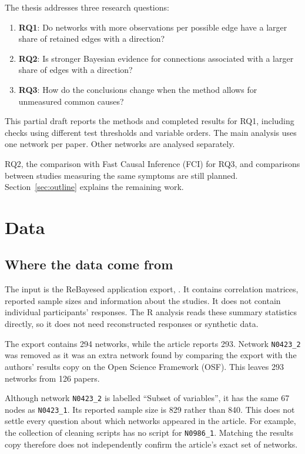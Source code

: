\documentclass[11pt,a4paper]{article}
\begin{document}
The thesis addresses three research questions:
\begin{enumerate}
\item \textbf{RQ1}: Do networks with more observations per possible edge have a larger share of retained edges with a direction?
\item \textbf{RQ2}: Is stronger Bayesian evidence for connections associated with a larger share of edges with a direction?
\item \textbf{RQ3}: How do the conclusions change when the method allows for unmeasured common causes?
\end{enumerate}

This partial draft reports the methods and completed results for RQ1, including checks using different test thresholds and variable orders. The main analysis uses one network per paper. Other networks are analysed separately.

RQ2, the comparison with Fast Causal Inference (FCI) for RQ3, and comparisons between studies measuring the same symptoms are still planned. Section~\ref{sec:outline} explains the remaining work.

\section{Data}
\subsection{Where the data come from}
The input is the ReBayesed application export, . It contains correlation matrices, reported sample sizes and information about the studies. It does not contain individual participants' responses. The R analysis reads these summary statistics directly, so it does not need reconstructed responses or synthetic data.

The export contains 294 networks, while the article reports 293. Network \texttt{N0423\_2} was removed as it was an extra network found by comparing the export with the authors' results copy on the Open Science Framework (OSF). This leaves 293 networks from 126 papers.

Although network \texttt{N0423\_2} is labelled ``Subset of variables'', it has the same 67 nodes as \texttt{N0423\_1}. Its reported sample size is 829 rather than 840. This does not settle every question about which networks appeared in the article. For example, the collection of cleaning scripts has no script for \texttt{N0986\_1}. Matching the results copy therefore does not independently confirm the article's exact set of networks.
\end{document}
